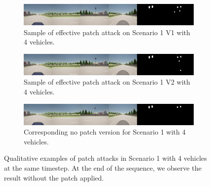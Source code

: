 \begin{figure}[tph]
    \centering
    \begin{subfigure}[b]{1\textwidth}
        \centering
        \includegraphics[width=\textwidth]{figures/results/scenario1v14vh.jpg}
        \caption{Sample of effective patch attack on Scenario 1 V1 with 4 vehicles.}
        \label{fig:scenario1_4vh_v1}
    \end{subfigure}
    \vspace{0.5cm}
    \begin{subfigure}[b]{1\textwidth}
        \centering
        \includegraphics[width=\textwidth]{figures/results/scenario1v24vh.jpg}
        \caption{Sample of effective patch attack on Scenario 1 V2 with 4 vehicles.}
        \label{fig:scenario1_4vh_v2}
    \end{subfigure}
    \begin{subfigure}[b]{1\textwidth}
        \centering
        \includegraphics[width=\textwidth]{figures/results/scenario1v14vh_nopatch.png}
        \caption{Corresponding no patch version for Scenario 1 with 4 vehicles.}
        \label{fig:scenario1_4vh_nopatch}
    \end{subfigure}
    \caption{Qualitative examples of patch attacks in Scenario 1 with 4 vehicles at the same timestep.
        At the end of the sequence, we observe the result without the patch applied.}
    \label{fig:scenario1_4vh}
\end{figure}

